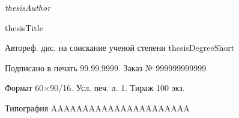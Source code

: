 \documentclass[a5paper,9pt,twoside]{extarticle} %
\begin{document}
\newpage\thispagestyle{empty}

\vspace*{0pt plus1fill}

\small
\begin{center}
    \textit{thesisAuthor}
    \par\medskip

    thesisTitle
    \par\medskip

    Автореф. дис. на соискание ученой степени thesisDegreeShort
    \par\bigskip

    Подписано в печать 99.99.9999.
    Заказ № 999999999999

    Формат 60\(\times\)90/16. Усл. печ. л. 1. Тираж 100 экз.

    Типография AAAAAAAAAAAAAAAAAAAAAA
\end{center}
\cleardoublepage
\end{document}
